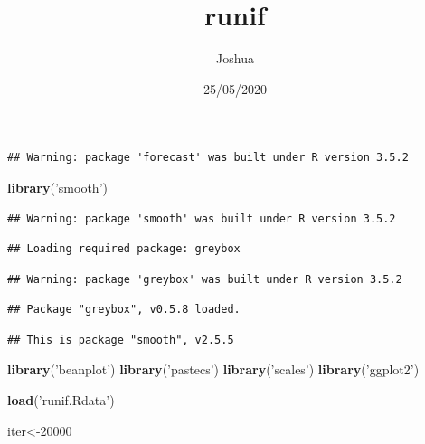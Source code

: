 \documentclass[
]{article}
\title{runif}
\author{Joshua}
\date{25/05/2020}
\newenvironment{Shaded}{\begin{snugshade}}{\end{snugshade}}
\newcommand{\DataTypeTok}[1]{\textcolor[rgb]{0.13,0.29,0.53}{#1}}
\newcommand{\DecValTok}[1]{\textcolor[rgb]{0.00,0.00,0.81}{#1}}
\newcommand{\KeywordTok}[1]{\textcolor[rgb]{0.13,0.29,0.53}{\textbf{#1}}}
\newcommand{\NormalTok}[1]{#1}
\newcommand{\OperatorTok}[1]{\textcolor[rgb]{0.81,0.36,0.00}{\textbf{#1}}}
\newcommand{\OtherTok}[1]{\textcolor[rgb]{0.56,0.35,0.01}{#1}}
\newcommand{\StringTok}[1]{\textcolor[rgb]{0.31,0.60,0.02}{#1}}
\begin{document}
\maketitle

\begin{Shaded}
\end{Shaded}

\begin{verbatim}
## Warning: package 'forecast' was built under R version 3.5.2
\end{verbatim}

\begin{Shaded}
\begin{Highlighting}[]
\KeywordTok{library}\NormalTok{(}\StringTok{'smooth'}\NormalTok{)}
\end{Highlighting}
\end{Shaded}

\begin{verbatim}
## Warning: package 'smooth' was built under R version 3.5.2
\end{verbatim}

\begin{verbatim}
## Loading required package: greybox
\end{verbatim}

\begin{verbatim}
## Warning: package 'greybox' was built under R version 3.5.2
\end{verbatim}

\begin{verbatim}
## Package "greybox", v0.5.8 loaded.
\end{verbatim}

\begin{verbatim}
## This is package "smooth", v2.5.5
\end{verbatim}

\begin{Shaded}
\begin{Highlighting}[]
\KeywordTok{library}\NormalTok{(}\StringTok{'beanplot'}\NormalTok{)}
\KeywordTok{library}\NormalTok{(}\StringTok{'pastecs'}\NormalTok{)}
\KeywordTok{library}\NormalTok{(}\StringTok{'scales'}\NormalTok{)}
\KeywordTok{library}\NormalTok{(}\StringTok{'ggplot2'}\NormalTok{)}

\KeywordTok{load}\NormalTok{(}\StringTok{'runif.Rdata'}\NormalTok{)}


\NormalTok{iter<-}\DecValTok{20000}
\end{Highlighting}
\end{Shaded}
\end{document}
